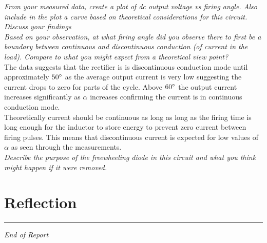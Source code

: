 \documentclass[12pt,a4paper]{article}
\begin{document}
\textit{From your measured data, create a plot of dc output voltage vs firing angle. Also include in the plot a curve based on theoretical considerations for this circuit. Discuss your findings}\\



\textit{Based on your observation, at what firing angle did you observe there to first be a boundary between continuous and discontinuous conduction (of current in the load). Compare to what you might expect from a theoretical view point?}\\

The data suggests that the rectifier is is discontinuous conduction mode until approximately $50\degree$ as the average output current is very low suggesting the current drops to zero for parts of the cycle. Above $60\degree$ the output current increases significantly as $\alpha$ increases confirming the current is in continuous conduction mode.\\
Theoretically current should be continuous as long as long as the firing time is long enough for the inductor to store energy to prevent zero current between firing pulses. This means that discontinuous current is expected for low values of $\alpha$ as seen through the measurements.\\

\textit{Describe the purpose of the freewheeling diode in this circuit and what you think might happen if it were removed.}\\

\section{Reflection}


\vfill
\hrule
\begin{center}
\textit{End of Report}
\end{center}
\end{document}
